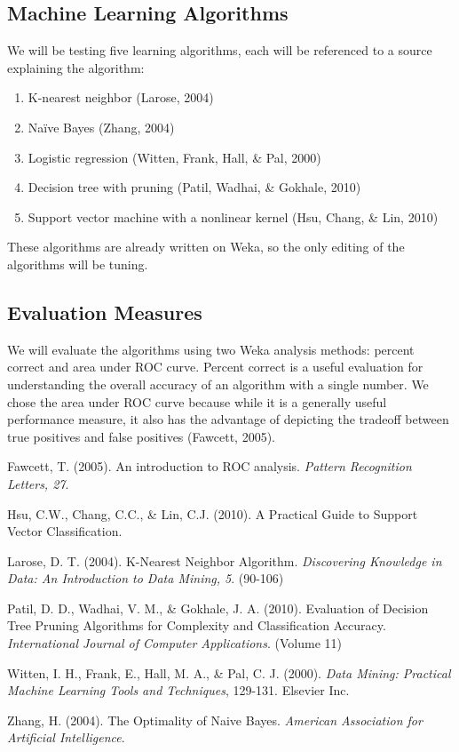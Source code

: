 \documentclass[11pt]{article} %
\begin{document}
\subsection{Machine Learning Algorithms}
We will be testing five learning algorithms, each will be referenced to a source explaining the algorithm:
\begin{enumerate}
	\item K-nearest neighbor (Larose, 2004)
	\item Na\"{i}ve Bayes (Zhang, 2004)
	\item Logistic regression (Witten, Frank, Hall, \& Pal, 2000)
	\item Decision tree with pruning (Patil, Wadhai, \& Gokhale, 2010)
	\item Support vector machine with a nonlinear kernel (Hsu, Chang, \& Lin, 2010)
\end{enumerate}
These algorithms are already written on Weka, so the only editing of the algorithms will be tuning.

\subsection{Evaluation Measures}
We will evaluate the algorithms using two Weka analysis methods: percent correct and area under ROC curve.  Percent correct is a useful evaluation for understanding the overall accuracy of an algorithm with a single number.  We chose the area under ROC curve because while it is a generally useful performance measure, it also has the advantage of depicting the tradeoff between true positives and false positives (Fawcett, 2005).


\begin{thebibliography}{9}
	Fawcett, T. (2005). An introduction to ROC analysis. \textit{Pattern Recognition Letters, 27}. 
	
	Hsu, C.W., Chang, C.C., \& Lin, C.J. (2010). A Practical Guide to Support Vector Classification. 
	
	Larose, D. T. (2004). K-Nearest Neighbor Algorithm. \textit{Discovering Knowledge in Data: An Introduction to Data Mining, 5}.  (90-106)
	
	Patil, D. D., Wadhai, V. M., \& Gokhale, J. A. (2010). Evaluation of Decision Tree Pruning Algorithms for Complexity and Classification Accuracy. \textit{International Journal of Computer Applications}. (Volume 11)
	
	Witten, I. H., Frank, E., Hall, M. A., \& Pal, C. J. (2000). \textit{Data Mining: Practical Machine Learning Tools and Techniques}, 129-131. Elsevier Inc.
	
	Zhang, H. (2004). The Optimality of Naive Bayes. \textit{American Association for Artificial Intelligence}.
	 
	
\end{thebibliography}
\end{document}
